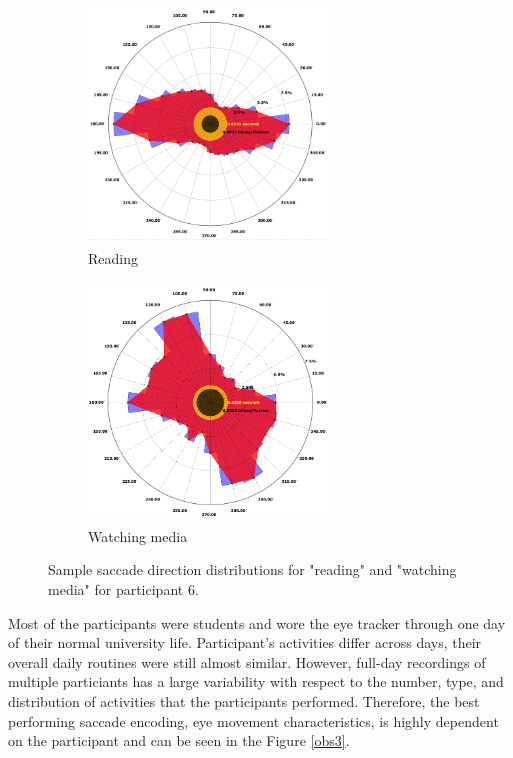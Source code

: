 \begin{figure}[!hbt]
  \begin{subfigure}{.5\textwidth}
    \centering
    \includegraphics[width=2.5in,height=2.5in]{obs1.png}
    \caption{Reading}
    \label{obs1}
  \end{subfigure}
  \begin{subfigure}{.5\textwidth}
    \centering
    \includegraphics[width=2.5in,height=2.5in]{obs2.png}
    \caption{Watching media}
    \label{obs2}
  \end{subfigure}
  \caption{Sample saccade direction distributions for "reading" and "watching media" for participant 6.}
\end{figure}


Most of the participants were students and wore the eye tracker through one day of their normal university life. Participant's activities differ across days, their overall daily routines were still almost similar. However, full-day recordings of multiple particiants has a large variability with respect to the number, type, and distribution of activities that the participants performed. Therefore, the best performing saccade encoding, eye movement characteristics, is highly dependent on the participant and can be seen in the Figure \ref{obs3}.\\ 

